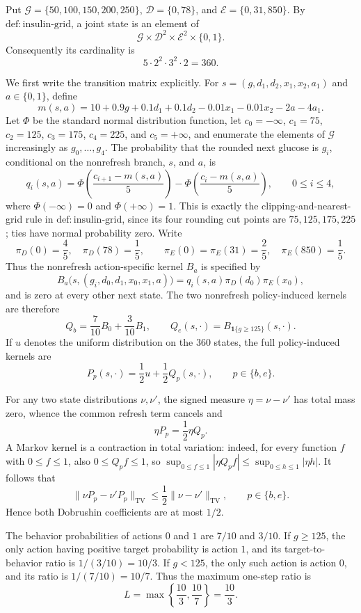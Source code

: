 Put \(\mathcal G=\{50,100,150,200,250\}\), \(\mathcal D=\{0,78\}\), and \(\mathcal E=\{0,31,850\}\).  By \(\mathrm{def{:}insulin\text{-}grid}\), a joint state is an element of
\[
 \mathcal G\times\mathcal D^2\times\mathcal E^2\times\{0,1\}.
\]
Consequently its cardinality is
\[
 5\cdot 2^2\cdot 3^2\cdot 2=360.
\]

We first write the transition matrix explicitly.  For
\(s=(g,d_1,d_2,x_1,x_2,a_1)\) and \(a\in\{0,1\}\), define
\[
 m(s,a)=10+0.9g+0.1d_1+0.1d_2-0.01x_1-0.01x_2-2a-4a_1.
\]
Let \(\Phi\) be the standard normal distribution function, let
\(c_0=-\infty\), \(c_1=75\), \(c_2=125\), \(c_3=175\),
\(c_4=225\), and \(c_5=+\infty\), and enumerate the elements of
\(\mathcal G\) increasingly as \(g_0,\ldots,g_4\).  The probability
that the rounded next glucose is \(g_i\), conditional on the
nonrefresh branch, \(s\), and \(a\), is
\[
 q_i(s,a)=\Phi\!\left(\frac{c_{i+1}-m(s,a)}5\right)
             -\Phi\!\left(\frac{c_i-m(s,a)}5\right),
 \qquad 0\le i\le4,
\]
where \(\Phi(-\infty)=0\) and \(\Phi(+\infty)=1\).  This is exactly
the clipping-and-nearest-grid rule in \(\mathrm{def{:}insulin\text{-}grid}\),
since its four rounding cut points are \(75,125,175,225\); ties have
normal probability zero.  Write
\[
 \pi_D(0)=\frac45,\quad \pi_D(78)=\frac15,
 \qquad
 \pi_E(0)=\pi_E(31)=\frac25,\quad \pi_E(850)=\frac15.
\]
Thus the nonrefresh action-specific kernel \(B_a\) is specified by
\[
 B_a\bigl(s,(g_i,d_0,d_1,x_0,x_1,a)\bigr)
   =q_i(s,a)\pi_D(d_0)\pi_E(x_0),
\]
and is zero at every other next state.  The two nonrefresh
policy-induced kernels are therefore
\[
 Q_b=\frac7{10}B_0+\frac3{10}B_1,
 \qquad
 Q_e(s,\cdot)=B_{\mathbf 1\{g\ge125\}}(s,\cdot).
\]
If \(u\) denotes the uniform distribution on the \(360\) states, the
full policy-induced kernels are
\[
 P_p(s,\cdot)=\frac12u+\frac12Q_p(s,\cdot),
 \qquad p\in\{b,e\}.
\]

For any two state distributions \(\nu,\nu'\), the signed measure
\(\eta=\nu-\nu'\) has total mass zero, whence the common refresh term
cancels and
\[
 \eta P_p=\frac12\eta Q_p.
\]
A Markov kernel is a contraction in total variation: indeed, for
every function \(f\) with \(0\le f\le1\), also \(0\le Q_pf\le1\), so
\(\sup_{0\le f\le1}|\eta Q_pf|\le\sup_{0\le h\le1}|\eta h|\).
It follows that
\[
 \|\nu P_p-\nu'P_p\|_{\mathrm{TV}}
 \le\frac12\|\nu-\nu'\|_{\mathrm{TV}},
 \qquad p\in\{b,e\}.
\]
Hence both Dobrushin coefficients are at most \(1/2\).

The behavior probabilities of actions \(0\) and \(1\) are \(7/10\)
and \(3/10\).  If \(g\ge125\), the only action having positive target
probability is action \(1\), and its target-to-behavior ratio is
\(1/(3/10)=10/3\).  If \(g<125\), the only such action is action
\(0\), and its ratio is \(1/(7/10)=10/7\).  Thus the maximum one-step
ratio is
\[
 L=\max\left\{\frac{10}{3},\frac{10}{7}\right\}=\frac{10}{3}.
\]


